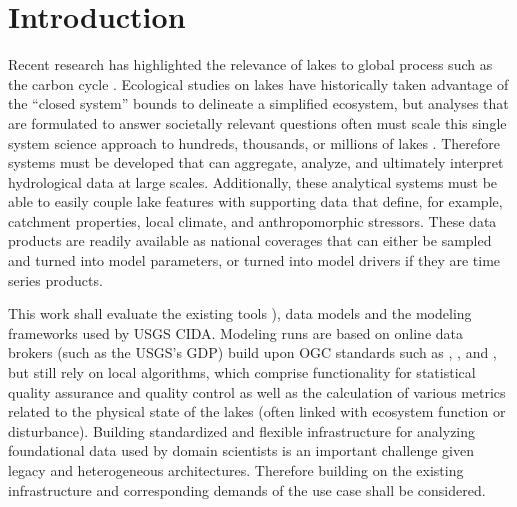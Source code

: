 

\chapter{Introduction}
	Recent research has highlighted the relevance of lakes to global process such as the carbon cycle \citep{cole2007plumbing}.
	Ecological studies on lakes have historically taken advantage of the “closed system” bounds to delineate a simplified ecosystem, but analyses that are formulated to answer societally relevant questions often must scale this single system science approach to hundreds, thousands, or millions of lakes \citep{downing2006global}.
	Therefore systems must be developed that can aggregate, analyze, and ultimately interpret hydrological data at large scales. Additionally, these analytical systems must be able to easily couple lake features with supporting data that define, for example, catchment properties, local climate, and anthropomorphic stressors.
	These data products are readily available as national coverages that can either be sampled and turned into model parameters, or turned into model drivers if they are time series products.

	This work shall evaluate the existing tools \citep[e.g. \la{}, see][]{read2011derivation}), data models and the modeling frameworks used by USGS CIDA.
	Modeling runs are based on online data brokers (such as the USGS’s \ac{GDP}) build upon \ac{OGC} standards such as , ,  and , but still rely on local algorithms, which comprise functionality for statistical quality assurance and quality control as well as the calculation of various metrics related to the physical state of the lakes (often linked with ecosystem function or disturbance). Building standardized and flexible infrastructure for analyzing foundational data used by domain scientists is an important challenge given legacy and heterogeneous architectures.
	Therefore building on the existing infrastructure and corresponding demands of the use case shall be considered.

